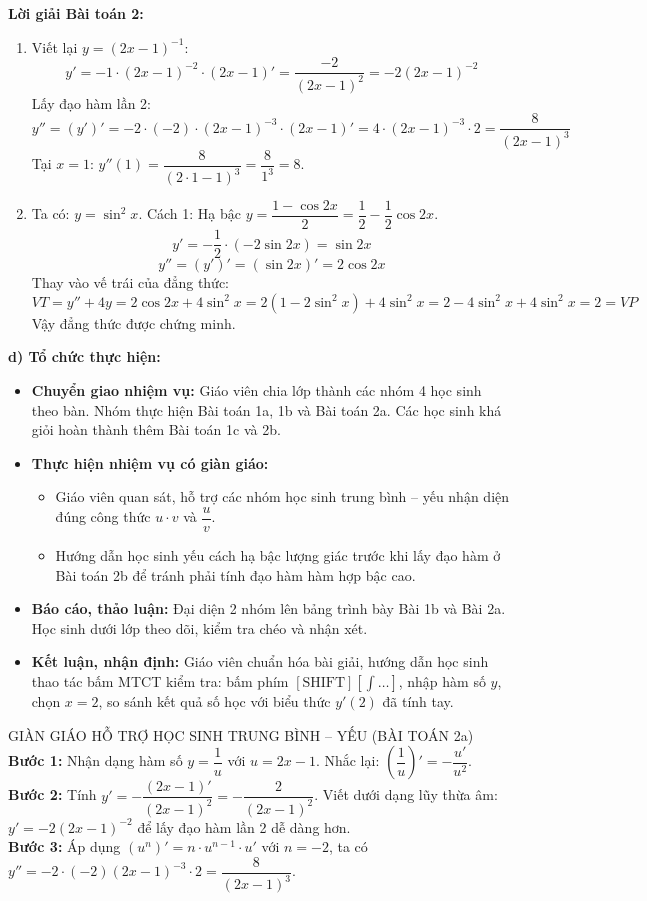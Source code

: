 \documentclass[12pt, a4paper]{article}
\begin{document}
\textbf{Lời giải Bài toán 2:}
\begin{enumerate}[label=\alph*)]
    \item Viết lại $y = (2x - 1)^{-1}$:
    $$y' = -1 \cdot (2x - 1)^{-2} \cdot (2x - 1)' = \dfrac{-2}{(2x - 1)^2} = -2(2x - 1)^{-2}$$
    Lấy đạo hàm lần 2:
    $$y'' = (y')' = -2 \cdot (-2) \cdot (2x - 1)^{-3} \cdot (2x - 1)' = 4 \cdot (2x - 1)^{-3} \cdot 2 = \dfrac{8}{(2x - 1)^3}$$
    Tại $x = 1$: $y''(1) = \dfrac{8}{(2 \cdot 1 - 1)^3} = \dfrac{8}{1^3} = 8$.

    \item Ta có: $y = \sin^2 x$.
    Cách 1: Hạ bậc $y = \dfrac{1 - \cos 2x}{2} = \dfrac{1}{2} - \dfrac{1}{2}\cos 2x$.
    $$y' = -\dfrac{1}{2} \cdot (-2\sin 2x) = \sin 2x$$
    $$y'' = (y')' = (\sin 2x)' = 2\cos 2x$$
    Thay vào vế trái của đẳng thức:
    $$VT = y'' + 4y = 2\cos 2x + 4\sin^2 x = 2(1 - 2\sin^2 x) + 4\sin^2 x = 2 - 4\sin^2 x + 4\sin^2 x = 2 = VP$$
    Vậy đẳng thức được chứng minh.
\end{enumerate}

\noindent \textbf{d) Tổ chức thực hiện:}
\begin{itemize}[leftmargin=0.6cm]
    \item \textbf{Chuyển giao nhiệm vụ:} Giáo viên chia lớp thành các nhóm 4 học sinh theo bàn. Nhóm thực hiện Bài toán 1a, 1b và Bài toán 2a. Các học sinh khá giỏi hoàn thành thêm Bài toán 1c và 2b.
    \item \textbf{Thực hiện nhiệm vụ có giàn giáo:}
    \begin{itemize}
        \item Giáo viên quan sát, hỗ trợ các nhóm học sinh trung bình -- yếu nhận diện đúng công thức $u \cdot v$ và $\dfrac{u}{v}$.
        \item Hướng dẫn học sinh yếu cách hạ bậc lượng giác trước khi lấy đạo hàm ở Bài toán 2b để tránh phải tính đạo hàm hàm hợp bậc cao.
    \end{itemize}
    \item \textbf{Báo cáo, thảo luận:} Đại diện 2 nhóm lên bảng trình bày Bài 1b và Bài 2a. Học sinh dưới lớp theo dõi, kiểm tra chéo và nhận xét.
    \item \textbf{Kết luận, nhận định:} Giáo viên chuẩn hóa bài giải, hướng dẫn học sinh thao tác bấm MTCT kiểm tra: bấm phím $\left[\text{SHIFT}\right] \left[\int \dots \right]$, nhập hàm số $y$, chọn $x = 2$, so sánh kết quả số học với biểu thức $y'(2)$ đã tính tay.
\end{itemize}

\begin{scaffoldbox}{GIÀN GIÁO HỖ TRỢ HỌC SINH TRUNG BÌNH -- YẾU (BÀI TOÁN 2a)}
\textbf{Bước 1:} Nhận dạng hàm số $y = \dfrac{1}{u}$ với $u = 2x - 1$. Nhắc lại: $\left(\dfrac{1}{u}\right)' = -\dfrac{u'}{u^2}$.\\
\textbf{Bước 2:} Tính $y' = -\dfrac{(2x - 1)'}{(2x - 1)^2} = -\dfrac{2}{(2x - 1)^2}$. Viết dưới dạng lũy thừa âm: $y' = -2(2x - 1)^{-2}$ để lấy đạo hàm lần 2 dễ dàng hơn.\\
\textbf{Bước 3:} Áp dụng $(u^n)' = n \cdot u^{n-1} \cdot u'$ với $n = -2$, ta có $y'' = -2 \cdot (-2)(2x - 1)^{-3} \cdot 2 = \dfrac{8}{(2x - 1)^3}$.
\end{scaffoldbox}
\end{document}
